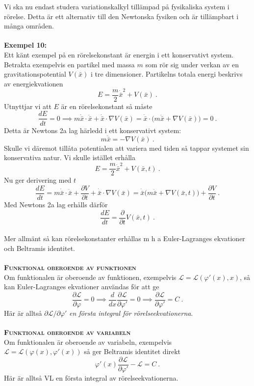 \documentclass{article}
\begin{document}
Vi ska nu endast studera variationskalkyl tillämpad på fysikaliska system i rörelse. Detta är ett alternativ till den Newtonska fysiken och är tillämpbart i många områden.\\ \\
\textbf{Exempel 10:}\\
Ett känt exempel på en rörelsekonstant är energin i ett konservativt system. Betrakta exempelvis en partikel med massa $m$ som rör sig under verkan av en gravitationspotential $V(\bar{x})$ i tre dimensioner. Partikelns totala energi beskrivs av energiekvationen
$$
E=\frac{m}{2}\dot{\bar{x}}^2+V(\bar{x}) \ .
$$
Utnyttjar vi att $E$ är en rörelsekonstant så måste
$$
\frac{dE}{dt}=0\implies m\dot{\bar{x}}\cdot\ddot{\bar{x}}+\dot{\bar{x}}\cdot\nabla V(\bar{x})=\dot{\bar{x}}\cdot\big(m\ddot{\bar{x}}+\nabla V(\bar{x})\big)=0 \ .
$$
Detta är Newtons 2a lag härledd i ett konservativt system: 
$$
m\ddot{\bar{x}}=-\nabla V(\bar{x}) \ .
$$
Skulle vi däremot tillåta potentialen att variera med tiden så tappar systemet sin konservativa natur. Vi skulle istället erhålla
$$
E=\frac{m}{2}\dot{\bar{x}}^2+V(\bar{x},t) \ .
$$
Nu ger derivering med $t$
$$
\frac{dE}{dt}=m\dot{\bar{x}}\cdot\ddot{\bar{x}}+\frac{\partial V}{\partial t}+\dot{\bar{x}}\cdot\nabla V(\bar{x})=\dot{\bar{x}}\big(m\ddot{\bar{x}}+\nabla V(\bar{x},t)\big)+\frac{\partial V}{\partial t} \ .
$$
Med Newtons 2a lag erhålls därför
$$
\frac{dE}{dt}=\frac{\partial}{\partial t}V(\bar{x},t) \ .
$$\\

Mer allmänt så kan rörelsekonstanter erhållas m h a Euler-Lagranges ekvationer och Beltramis identitet. \\ \\
\textbf{\textsc{Funktional oberoende av funktionen}}\\
Om funktionalen är oberoende av funktionen, exempelvis $\mathcal{L}=\mathcal{L}(\varphi'(x),x)$, så kan Euler-Lagranges ekvationer användas för att ge
$$
\frac{\partial\mathcal{L}}{\partial\varphi}=0\implies \frac{d}{dx}\frac{\partial\mathcal{L}}{\partial\varphi'}=0\implies \frac{\partial\mathcal{L}}{\partial\varphi'}=C \ .
$$
Här är alltså $\partial\mathcal{L}/\partial\varphi'$ \textit{en första integral för rörelseekvationerna}.\\ \\
\textbf{\textsc{Funktional oberoende av variabeln}}\\
Om funktionalen är oberoende av variabeln, exempelvis $\mathcal{L}=\mathcal{L}(\varphi(x),\varphi'(x))$ så ger Beltramis identitet direkt
$$
\varphi'(x)\frac{\partial\mathcal{L}}{\partial\varphi'}-\mathcal{L}=C \ .
$$
Här är alltså VL en första integral av rörelseekvationerna.
\end{document}
